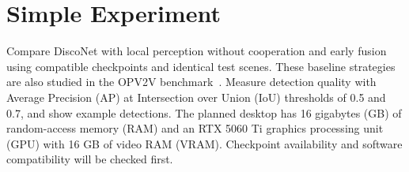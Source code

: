 \section*{Simple Experiment}
Compare DiscoNet with local perception without cooperation and early fusion using compatible checkpoints and identical test scenes.
These baseline strategies are also studied in the OPV2V benchmark~\cite{xu2022opv2v}.
Measure detection quality with Average Precision (AP) at Intersection over Union (IoU) thresholds of 0.5 and 0.7, and show example detections.
The planned desktop has 16 gigabytes (GB) of random-access memory (RAM) and an RTX 5060 Ti graphics processing unit (GPU) with 16 GB of video RAM (VRAM).
Checkpoint availability and software compatibility will be checked first.
